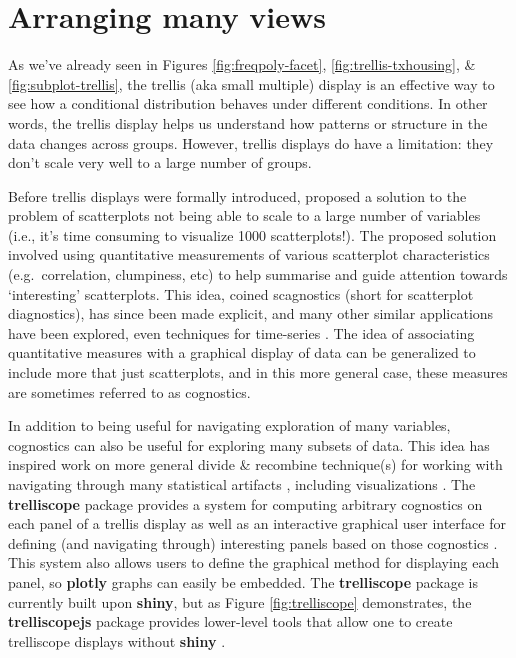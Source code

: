 \documentclass[
  12pt,
]{krantz}
\begin{document}
\hypertarget{navigating-many-views}{%
\section{Arranging many views}\label{navigating-many-views}}


As we've already seen in Figures \ref{fig:freqpoly-facet}, \ref{fig:trellis-txhousing}, \& \ref{fig:subplot-trellis}, the trellis (aka small multiple) display is an effective way to see how a conditional distribution behaves under different conditions. In other words, the trellis display helps us understand how patterns or structure in the data changes across groups. However, trellis displays do have a limitation: they don't scale very well to a large number of groups.

Before trellis displays were formally introduced, \citet{scagnostics-tukey} proposed a solution to the problem of scatterplots not being able to scale to a large number of variables (i.e., it's time consuming to visualize 1000 scatterplots!). The proposed solution involved using quantitative measurements of various scatterplot characteristics (e.g.~correlation, clumpiness, etc) to help summarise and guide attention towards `interesting' scatterplots. This idea, coined scagnostics (short for scatterplot diagnostics), has since been made explicit, and many other similar applications have been explored, even techniques for time-series \citep{Wilkinson:2005b, Wilkinson:2008, Wilkinson:2012}. The idea of associating quantitative measures with a graphical display of data can be generalized to include more that just scatterplots, and in this more general case, these measures are sometimes referred to as cognostics.

In addition to being useful for navigating exploration of many variables, cognostics can also be useful for exploring many subsets of data. This idea has inspired work on more general divide \& recombine technique(s) for working with navigating through many statistical artifacts \citep{divide-recombine, RHIPE}, including visualizations \citep{trelliscope}. The \textbf{trelliscope} package provides a system for computing arbitrary cognostics on each panel of a trellis display as well as an interactive graphical user interface for defining (and navigating through) interesting panels based on those cognostics \citep{trelliscope-pkg}. This system also allows users to define the graphical method for displaying each panel, so \textbf{plotly} graphs can easily be embedded. The \textbf{trelliscope} package is currently built upon \textbf{shiny}, but as Figure \ref{fig:trelliscope} demonstrates, the \textbf{trelliscopejs} package provides lower-level tools that allow one to create trelliscope displays without \textbf{shiny} \citep{trelliscopejs}.
\end{document}
